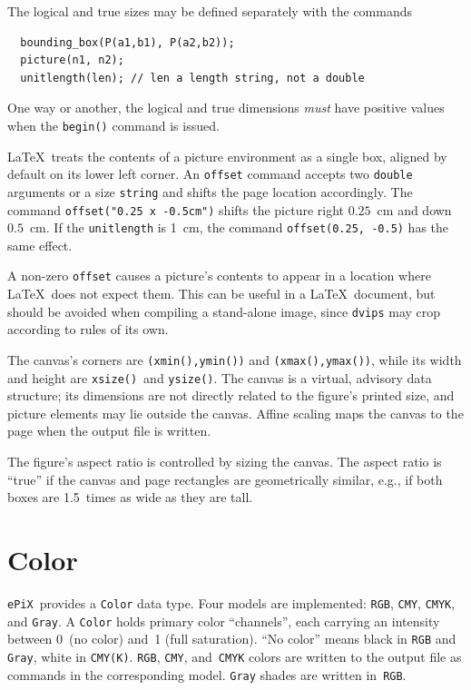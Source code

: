 \documentclass[12pt,letterpaper]{book}
\newcommand{\code}[1]{\texttt{#1}}
\newcommand{\ePiX}{\code{ePiX}}
\newcommand{\teximath}[1]{$#1$}
\newcommand{\findex}[1]{\ignorespaces}
\begin{document}
The logical and true sizes may be defined separately with the commands
\findex{bounding\_box}
\findex{picture}
\findex{unitlength}
\begin{verbatim}
  bounding_box(P(a1,b1), P(a2,b2));
  picture(n1, n2);
  unitlength(len); // len a length string, not a double
\end{verbatim}
One way or another, the logical and true dimensions \emph{must} have
positive values when the \code{begin()} command is issued.

\LaTeX\ treats the contents of a picture environment as a single box,
aligned by default on its lower left corner. An \code{offset} command
accepts two \code{double} arguments or a size \code{string} and shifts
the page location accordingly. The command
\code{offset("0.25 x -0.5cm")} shifts the picture right
\teximath{0.25}~cm and down \teximath{0.5}~cm.  If the
\code{unitlength} is 1~cm, the command \code{offset(0.25, -0.5)} has
the same effect.

A non-zero \code{offset} causes a picture's contents to appear in a
location where \LaTeX\ does not expect them. This can be useful in a
\LaTeX\ document, but should be avoided when compiling a stand-alone
image, since \code{dvips} may crop according to rules of its own.


The canvas's corners are \code{(xmin(),ymin())} and
\code{(xmax(),ymax())}, while its width and height are
\code{xsize()}~and \code{ysize()}. The canvas is a virtual, advisory
data structure; its dimensions are not directly related to the
figure's printed size, and picture elements may lie outside the
canvas. Affine scaling maps the canvas to the page when the output
file is written.
\begin{center}

\end{center}
\label{page-scaling}
The figure's aspect ratio is controlled by sizing the canvas.  The
aspect ratio is ``true'' if the canvas and page rectangles are
geometrically similar, e.g., if both boxes are 1.5~times as wide as
they are tall.


\section{Color}
\label{section-color}

\ePiX\ provides a \code{Color} data type. Four models are implemented:
\code{RGB}, \code{CMY}, \code{CMYK}, and \code{Gray}.  A \code{Color}
holds primary color ``channels'', each carrying an intensity between
0~(no color) and~1 (full saturation).  ``No color'' means black in
\code{RGB} and \code{Gray}, white in \code{CMY(K)}.  \code{RGB},
\code{CMY}, and~\code{CMYK} colors are written to the output file as
commands in the corresponding model. \code{Gray} shades are written
in~\code{RGB}.
\end{document}
